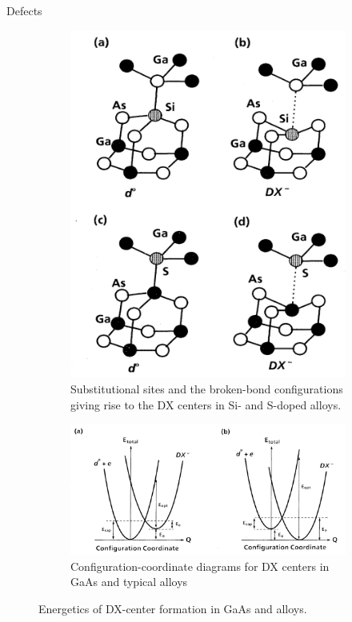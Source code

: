 \documentclass[aspectratio=169]{beamer}
\begin{document}
    \begin{frame}{Defects}
        \begin{figure}
            \centering
            \begin{subfigure}{0.3\textwidth}
                \centering
                \includegraphics[width=0.7\linewidth]{lectures/figures/8_DX_Centers.png}
                \caption{Substitutional sites and the broken-bond configurations giving rise to the DX centers in Si- and S-doped  alloys.}
            \end{subfigure}
            \begin{subfigure}{0.65\textwidth}
                \centering
                \includegraphics[width=\linewidth]{lectures/figures/8_Configuration_Diagram.png}
                \caption{Configuration-coordinate diagrams for DX centers in GaAs and typical  alloys}
            \end{subfigure}
            \caption{Energetics of DX-center formation in GaAs and  alloys.\cite{chadiEnergeticsDXcenterFormation1989}}
            \label{fig}
        \end{figure}
    \end{frame}
\end{document}
